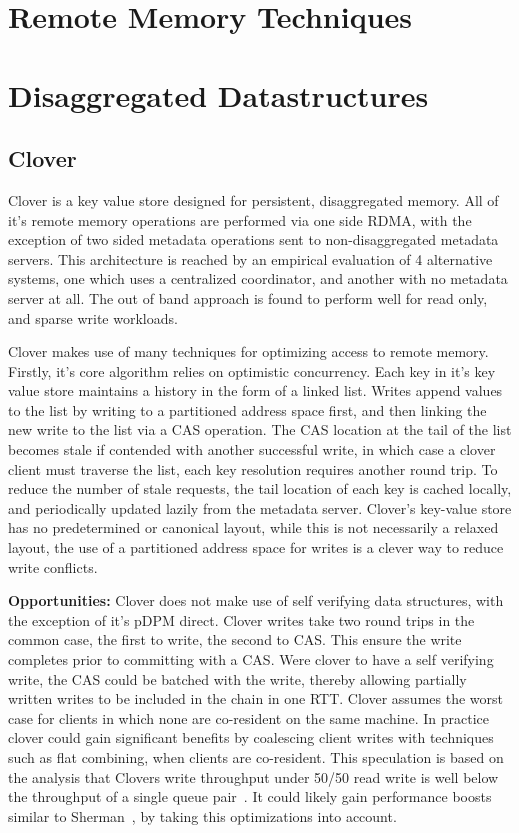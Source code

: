 \section{Remote Memory Techniques}


\section{Disaggregated Datastructures}

\subsection{Clover}

Clover is a key value store designed for persistent, disaggregated memory. All
of it's remote memory operations are performed via one side RDMA, with the
exception of two sided metadata operations sent to non-disaggregated metadata
servers. This architecture is reached by an empirical evaluation of 4
alternative systems, one which uses a centralized coordinator, and another with
no metadata server at all. The out of band approach is found to perform well for
read only, and sparse write workloads. 

Clover makes use of many techniques for optimizing access to remote memory.
Firstly, it's core algorithm relies on optimistic concurrency. Each key in it's
key value store maintains a history in the form of a linked list. Writes append
values to the list by writing to a partitioned address space first, and then
linking the new write to the list via a CAS operation. The CAS location at the
tail of the list becomes stale if contended with another successful write, in
which case a clover client must traverse the list, each key resolution requires
another round trip. To reduce the number of stale requests, the tail location of
each key is cached locally, and periodically updated lazily from the metadata
server. Clover's key-value store has no predetermined or canonical layout, while
this is not necessarily a relaxed layout, the use of a partitioned address space
for writes is a clever way to reduce write conflicts.


\textbf{Opportunities:} Clover does not make use of self verifying data
structures, with the exception of it's pDPM direct. Clover writes take two round
trips in the common case, the first to write, the second to CAS. This ensure the
write completes prior to committing with a CAS. Were clover to have a self
verifying write, the CAS could be batched with the write, thereby allowing
partially written writes to be included in the chain in one RTT. Clover assumes
the worst case for clients in which none are co-resident on the same machine. In
practice clover could gain significant benefits by coalescing client writes with
techniques such as flat combining, when clients are co-resident. This
speculation is based on the analysis that Clovers write throughput under 50/50
read write is well below the throughput of a single queue
pair~\cite{design-guidelines}. It could likely gain performance boosts similar
to Sherman~\cite{sherman}, by taking this optimizations into account. 

